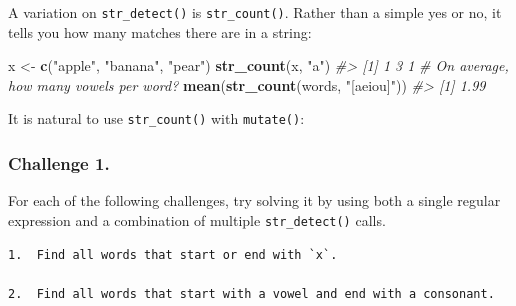 \documentclass[
]{book}
\newenvironment{Shaded}{\begin{snugshade}}{\end{snugshade}}
\newcommand{\CommentTok}[1]{\textcolor[rgb]{0.56,0.35,0.01}{\textit{#1}}}
\newcommand{\DataTypeTok}[1]{\textcolor[rgb]{0.13,0.29,0.53}{#1}}
\newcommand{\KeywordTok}[1]{\textcolor[rgb]{0.13,0.29,0.53}{\textbf{#1}}}
\newcommand{\NormalTok}[1]{#1}
\newcommand{\OperatorTok}[1]{\textcolor[rgb]{0.81,0.36,0.00}{\textbf{#1}}}
\newcommand{\StringTok}[1]{\textcolor[rgb]{0.31,0.60,0.02}{#1}}
\begin{document}
A variation on \texttt{str\_detect()} is \texttt{str\_count()}. Rather than a simple yes or no, it tells you how many matches there are in a string:

\begin{Shaded}
\begin{Highlighting}[]
\NormalTok{x <-}\StringTok{ }\KeywordTok{c}\NormalTok{(}\StringTok{"apple"}\NormalTok{, }\StringTok{"banana"}\NormalTok{, }\StringTok{"pear"}\NormalTok{)}
\KeywordTok{str_count}\NormalTok{(x, }\StringTok{"a"}\NormalTok{)}
\CommentTok{#> [1] 1 3 1}
\CommentTok{# On average, how many vowels per word?}
\KeywordTok{mean}\NormalTok{(}\KeywordTok{str_count}\NormalTok{(words, }\StringTok{"[aeiou]"}\NormalTok{))}
\CommentTok{#> [1] 1.99}
\end{Highlighting}
\end{Shaded}

It is natural to use \texttt{str\_count()} with \texttt{mutate()}:

\begin{Shaded}
\end{Shaded}

\hypertarget{challenge-1.-12}{%
\subsubsection*{Challenge 1.}\label{challenge-1.-12}}

For each of the following challenges, try solving it by using both a single regular expression and a combination of multiple \texttt{str\_detect()} calls.

\begin{verbatim}
1.  Find all words that start or end with `x`.

2.  Find all words that start with a vowel and end with a consonant.
\end{verbatim}
\end{document}
